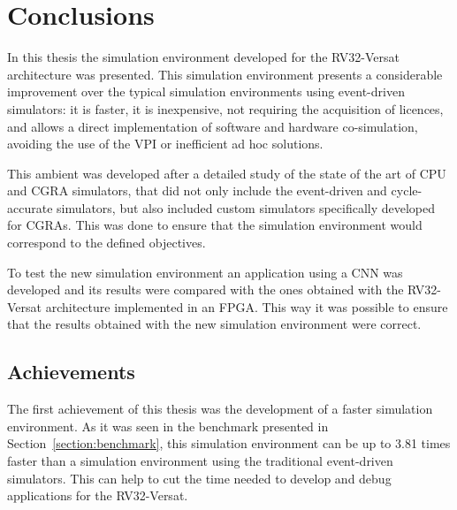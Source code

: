 
\chapter{Conclusions}
\label{chapter:conclusions}

In this thesis the simulation environment developed for the RV32-Versat architecture was 
presented. This simulation environment presents a considerable improvement over the 
typical simulation environments using event-driven simulators: it is faster, it is 
inexpensive, not requiring the acquisition of licences, and allows a direct 
implementation of software and hardware co-simulation, avoiding the use of the \ac{VPI} 
or inefficient ad hoc solutions.

This ambient was developed after a detailed study of the state of the art of 
\ac{CPU} and \ac{CGRA} simulators, that did not only include the event-driven and 
cycle-accurate simulators, but also included custom simulators specifically developed for 
CGRAs. This was done to ensure that the simulation environment would correspond to the 
defined objectives.

To test the new simulation environment an application using a \ac{CNN} was developed and 
its results were compared with the ones obtained with the RV32-Versat architecture 
implemented in an \ac{FPGA}. This way it was possible to ensure that the results obtained 
with the new simulation environment were correct.

\section{Achievements}
\label{section:achievements}

The first achievement of this thesis was the development of a faster simulation 
environment. As it was seen in the benchmark presented in 
Section~\ref{section:benchmark}, this simulation environment can be up to 3.81 times 
faster than a simulation environment using the traditional event-driven simulators. This 
can help to cut the time needed to develop and debug applications for the RV32-Versat.

